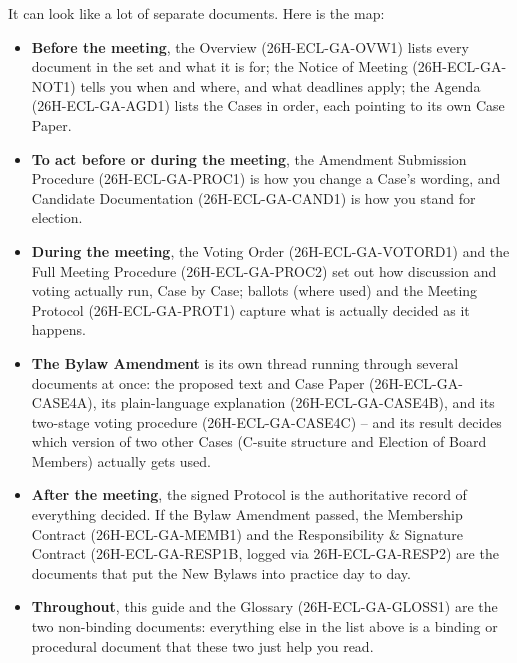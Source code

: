 \documentclass{../../../Common/Latex/Templates/rapport}
\begin{document}
It can look like a lot of separate documents. Here is the map:
\begin{itemize}
  \item \textbf{Before the meeting}, the Overview (26H-ECL-GA-OVW1) lists every document in the set and what it is for; the Notice of Meeting (26H-ECL-GA-NOT1) tells you when and where, and what deadlines apply; the Agenda (26H-ECL-GA-AGD1) lists the Cases in order, each pointing to its own Case Paper.
  \item \textbf{To act before or during the meeting}, the Amendment Submission Procedure (26H-ECL-GA-PROC1) is how you change a Case's wording, and Candidate Documentation (26H-ECL-GA-CAND1) is how you stand for election.
  \item \textbf{During the meeting}, the Voting Order (26H-ECL-GA-VOTORD1) and the Full Meeting Procedure (26H-ECL-GA-PROC2) set out how discussion and voting actually run, Case by Case; ballots (where used) and the Meeting Protocol (26H-ECL-GA-PROT1) capture what is actually decided as it happens.
  \item \textbf{The Bylaw Amendment} is its own thread running through several documents at once: the proposed text and Case Paper (26H-ECL-GA-CASE4A), its plain-language explanation (26H-ECL-GA-CASE4B), and its two-stage voting procedure (26H-ECL-GA-CASE4C) -- and its result decides which version of two other Cases (C-suite structure and Election of Board Members) actually gets used.
  \item \textbf{After the meeting}, the signed Protocol is the authoritative record of everything decided. If the Bylaw Amendment passed, the Membership Contract (26H-ECL-GA-MEMB1) and the Responsibility \& Signature Contract (26H-ECL-GA-RESP1B, logged via 26H-ECL-GA-RESP2) are the documents that put the New Bylaws into practice day to day.
  \item \textbf{Throughout}, this guide and the Glossary (26H-ECL-GA-GLOSS1) are the two non-binding documents: everything else in the list above is a binding or procedural document that these two just help you read.
\end{itemize}
\end{document}
